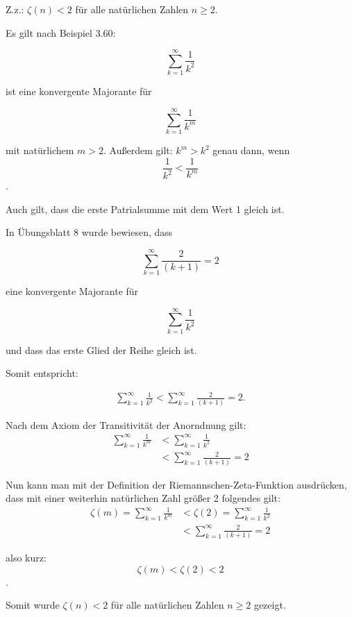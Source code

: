\begin{lsg}

Z.z.: $\zeta(n) < 2$ f\"ur alle nat\"urlichen Zahlen $n\geq 2$. 


Es gilt nach Beispiel 3.60: 

\[ \displaystyle\sum_{k=1}^{\infty}\frac{1}{k^{2}}\]

ist eine konvergente Majorante für

\[ \displaystyle\sum_{k=1}^{\infty}\frac{1}{k^{m}}\] 

mit natürlichem $m > 2$. Außerdem gilt: $k^m > k^2$  genau dann, wenn  
$$\frac{1}{k^2} < \frac{1}{k^m}$$.

Auch gilt, dass die erste Patrialsumme mit dem Wert 1 gleich ist.

In Übungsblatt 8 wurde bewiesen, dass 

\[ \displaystyle\sum_{k=1}^{\infty}\frac{2}{(k+1)}=2\]

eine konvergente Majorante für 

\[ \displaystyle\sum_{k=1}^{\infty}\frac{1}{k^{2}}\]

und dass das erste Glied der Reihe gleich ist.

Somit entspricht: 


\begin{align*}
 \displaystyle\sum_{k=1}^{\infty}\frac{1}{k^{2}} < 
\displaystyle\sum_{k=1}^{\infty}\frac{2}{(k+1)}=2.
\end{align*}

Nach dem Axiom der Transitivität der Anorndnung gilt: 
\begin{align*}
\displaystyle\sum_{k=1}^{\infty}\frac{1}{k^{m}} 
& < \displaystyle\sum_{k=1}^{\infty}\frac{1}{k^{2}}
\\
& < \displaystyle\sum_{k=1}^{\infty}\frac{2}{(k+1)}=2
\end{align*}

Nun kann man mit der Definition der Riemannschen-Zeta-Funktion ausdrücken, dass 
mit einer weiterhin natürlichen Zahl größer 2 folgendes gilt:
\begin{align*}
 \zeta(m) = \displaystyle\sum_{k=1}^{\infty}\frac{1}{k^{m}}
& <
\zeta(2) = \displaystyle\sum_{k=1}^{\infty}\frac{1}{k^{2}}
\\ 
& <
\displaystyle\sum_{k=1}^{\infty}\frac{2}{(k+1)}=2
\end{align*}

also kurz: $$ \zeta(m) < \zeta(2) < 2 $$.

Somit wurde $\zeta(n) < 2$ f\"ur alle nat\"urlichen Zahlen $n\geq 2$ gezeigt.
\end{lsg}
 
